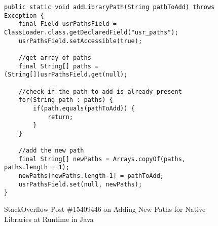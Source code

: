 \begin{figure}[htbp]
	\centering
\begin{lstlisting}[]
public static void addLibraryPath(String pathToAdd) throws Exception {
    final Field usrPathsField = ClassLoader.class.getDeclaredField("usr_paths");
    usrPathsField.setAccessible(true);

    //get array of paths
    final String[] paths = (String[])usrPathsField.get(null);

    //check if the path to add is already present
    for(String path : paths) {
        if(path.equals(pathToAdd)) {
            return;
        }
    }

    //add the new path
    final String[] newPaths = Arrays.copyOf(paths, paths.length + 1);
    newPaths[newPaths.length-1] = pathToAdd;
    usrPathsField.set(null, newPaths);
}
\end{lstlisting}
        \vspace{-12pt}
        \caption{StackOverflow Post \#15409446 on Adding New Paths for
          Native Libraries at Runtime in Java}
        \label{fig:example1}
\end{figure}
